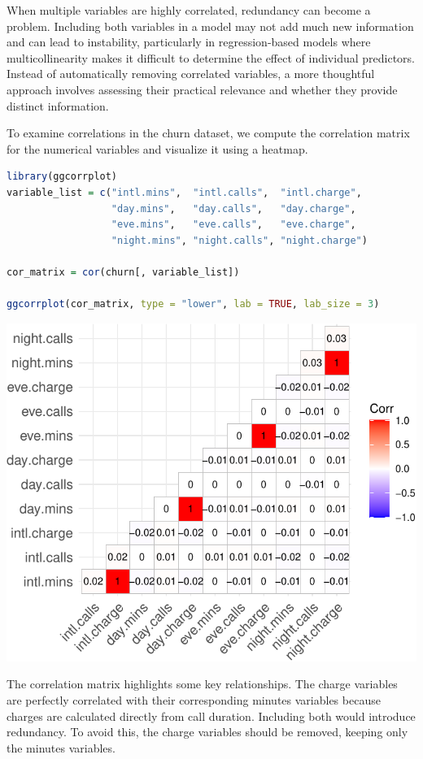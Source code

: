 \documentclass[
]{book}
\theoremstyle{definition}
\theoremstyle{definition}
\theoremstyle{definition}
\theoremstyle{definition}
\theoremstyle{remark}
\begin{document}
When multiple variables are highly correlated, redundancy can become a problem. Including both variables in a model may not add much new information and can lead to instability, particularly in regression-based models where multicollinearity makes it difficult to determine the effect of individual predictors. Instead of automatically removing correlated variables, a more thoughtful approach involves assessing their practical relevance and whether they provide distinct information.

To examine correlations in the churn dataset, we compute the correlation matrix for the numerical variables and visualize it using a heatmap.

\begin{lstlisting}[language=R]
library(ggcorrplot)  
variable_list = c("intl.mins",  "intl.calls",  "intl.charge", 
                  "day.mins",   "day.calls",   "day.charge",
                  "eve.mins",   "eve.calls",   "eve.charge",
                  "night.mins", "night.calls", "night.charge")

cor_matrix = cor(churn[, variable_list])

ggcorrplot(cor_matrix, type = "lower", lab = TRUE, lab_size = 3)
\end{lstlisting}

\begin{center}\includegraphics[width=1\linewidth]{EDA_files/figure-latex/unnamed-chunk-18-1} \end{center}

The correlation matrix highlights some key relationships. The charge variables are perfectly correlated with their corresponding minutes variables because charges are calculated directly from call duration. Including both would introduce redundancy. To avoid this, the charge variables should be removed, keeping only the minutes variables.
\end{document}
